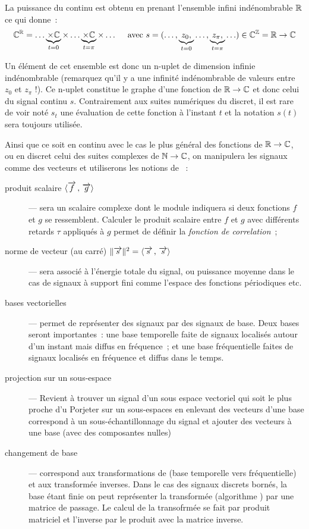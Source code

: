 \begin{remarque}
  
  La puissance du continu est obtenu en prenant l'ensemble infini
  indénombrable $\mathbb{R}$ ce qui donne~:
  $$ \mathbb{C}^{\mathbb{R}} = \ldots \underbrace{\times\mathbb{C}}_{t=0} \times \ldots \underbrace{\times\mathbb{C}}_{t=\pi} \times \ldots \quad\text{ avec } s=(\ldots, \underbrace{z_0, }_{t=0} \ldots, \underbrace{z_\pi, }_{t=\pi} \ldots) \in  \mathbb{C}^{\mathbb{Z}}=\mathbb{R}\to\mathbb{C}$$

Un élément de cet ensemble est donc un n-uplet de dimension infinie
indénombrable (remarquez qu'il y a une infinité indénombrable de
valeurs entre $z_0$ et $ z_\pi$ !). Ce n-uplet constitue le graphe
d'une fonction de $\mathbb{R}\to\mathbb{C}$ et donc celui du signal continu
$s$. Contrairement aux suites numériques du discret, il est rare de
voir noté $s_t$ une évaluation de cette fonction à l'instant $t$ et la
notation $s(t)$ sera toujours utilisée.
\end{remarque}


Ainsi que ce soit en continu avec le cas le plus général des fonctions
de $\mathbb{R}\to\mathbb{C}$, ou en discret celui des suites complexes de $\mathbb{N}\to\mathbb{C}$,
on manipulera les signaux comme des vecteurs et utiliserons les
notions de ~:
 \begin{description}
 \item[produit scalaire $\langle\overrightarrow{f}\,,\,\overrightarrow{g}\rangle$]--- sera un scalaire
   complexe dont le module indiquera si deux fonctions $f$ et $g$ se
   ressemblent. Calculer le produit scalaire entre $f$ et $g$ avec
   différents retards $\tau$ appliqués à $g$ permet de définir la
   \emph{fonction de correlation}~;
 \item[norme de vecteur (au carré)
   $\|\overrightarrow{s}\|^2=\langle\overrightarrow{s}\,,\,\overrightarrow{s}\rangle$]--- sera associé à l'énergie
   totale du signal, ou puissance moyenne dans le cas de signaux à
   support fini comme l'espace des fonctions périodiques etc.
 \item[bases vectorielles]--- permet de représenter des
   signaux par des signaux de base. Deux bases seront importantes~:
   une base temporelle faite de signaux localisés autour d'un instant
   mais diffus en fréquence~; et une base fréquentielle faites de
   signaux localisés en fréquence et diffus dans le temps.
 \item[projection sur un sous-espace]--- Revient à trouver un signal
   d'un sous espace vectoriel qui soit le plus proche d'u Porjeter sur
   un sous-espaces en enlevant des vecteurs d'une base correspond à un
   sous-échantillonnage du signal et ajouter des vecteurs à une base
   (avec des composantes nulles)
 \item[changement de base]--- correspond aux transformations de
   \Fourier{} (base temporelle vers fréquentielle) et aux transformée
   inverses. Dans le cas des signaux discrets bornés, la base étant
   finie on peut représenter la transformée \TFD{} (algorithme \FFT)
   par une matrice de passage. Le calcul de la transofrmée se fait par
   produit matriciel et l'inverse par le produit avec la matrice
   inverse.
\end{description}
 
